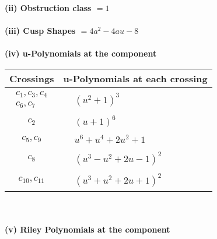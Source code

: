 \documentclass[1p]{elsarticle_modified}
\theoremstyle{definition}
\begin{document}
\flushleft \textbf{(ii) Obstruction class $= 1$}\\~\\
\flushleft \textbf{(iii) Cusp Shapes $= 4 a^2-4 a u-8$}\\~\\
\newpage\renewcommand{\arraystretch}{1}
\flushleft \textbf{(iv) u-Polynomials at the component}\newline \\
\begin{tabular}{m{50pt}|m{274pt}}
Crossings & \hspace{64pt}u-Polynomials at each crossing \\
\hline $$\begin{aligned}c_{1},c_{3},c_{4}\\c_{6},c_{7}\end{aligned}$$&$\begin{aligned}
&(u^2+1)^3
\end{aligned}$\\
\hline $$\begin{aligned}c_{2}\end{aligned}$$&$\begin{aligned}
&(u+1)^6
\end{aligned}$\\
\hline $$\begin{aligned}c_{5},c_{9}\end{aligned}$$&$\begin{aligned}
&u^6+u^4+2 u^2+1
\end{aligned}$\\
\hline $$\begin{aligned}c_{8}\end{aligned}$$&$\begin{aligned}
&(u^3- u^2+2 u-1)^2
\end{aligned}$\\
\hline $$\begin{aligned}c_{10},c_{11}\end{aligned}$$&$\begin{aligned}
&(u^3+u^2+2 u+1)^2
\end{aligned}$\\
\hline
\end{tabular}\\~\\
\newpage\renewcommand{\arraystretch}{1}
\flushleft \textbf{(v) Riley Polynomials at the component}\newline \\
\end{document}
